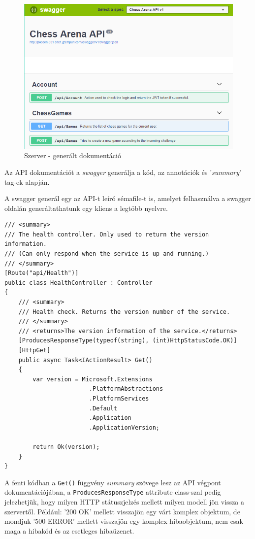 \documentclass[twoside, a4paper, 12pt]{article}
\begin{document}
\begin{figure}[htbp]
	\centering
	\includegraphics[width=1.0\textwidth]{img/serverUiDocumentation.png}
	\caption{Szerver - generált dokumentáció}
	\label{fig:serverUiDocumentation}
\end{figure}
Az API dokumentációt a \textit{swagger}\cite{swaggerHomepage} generálja a kód, az annotációk és '\textit{summary}' tag-ek alapján.

A swagger generál egy az API-t leíró sémafile-t is, amelyet felhasználva a swagger oldalán generáltathatunk egy kliens a legtöbb nyelvre.

\begin{lstlisting}[caption=Health-check példakód 'summary' tag-ekkel., label=lst:healtcheck]
/// <summary>
/// The health controller. Only used to return the version information.
/// (Can only respond when the service is up and running.)
/// </summary>
[Route("api/Health")]
public class HealthController : Controller
{
	/// <summary>
	/// Health check. Returns the version number of the service.
	/// </summary>
	/// <returns>The version information of the service.</returns>
	[ProducesResponseType(typeof(string), (int)HttpStatusCode.OK)]
	[HttpGet]
	public async Task<IActionResult> Get()
	{
		var version = Microsoft.Extensions
						.PlatformAbstractions
						.PlatformServices
						.Default
						.Application
						.ApplicationVersion;

		return Ok(version);
	}
}
\end{lstlisting}

A fenti kódban a \texttt{Get()} függvény \textit{summary} szövege lesz az API végpont dokumentációjában, a \texttt{ProducesResponseType} attribute class-szal pedig jelezhetjük, hogy milyen HTTP státuszjelzés mellett milyen modell jön vissza a szervertől. Például: '200 OK' mellett visszajön egy várt komplex objektum, de mondjuk '500 ERROR' mellett visszajön egy komplex hibaobjektum, nem csak maga a hibakód és az esetleges hibaüzenet.
\end{document}
